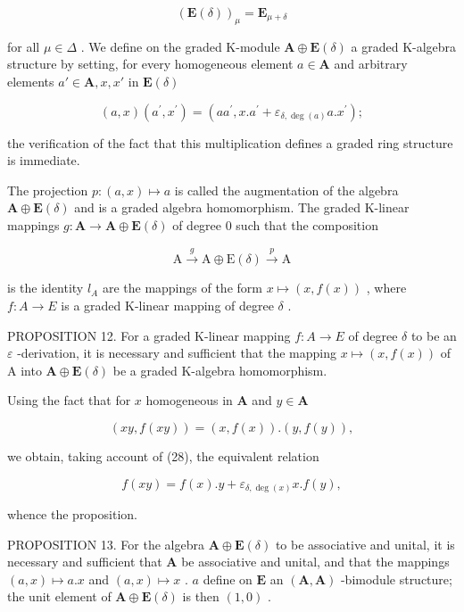 \[
(\mathbf {E} (\delta)) _ {\mu} = \mathbf {E} _ {\mu + \delta}
\]

for all \(\mu \in \Delta\) . We define on the graded K-module \(\mathbf{A} \oplus \mathbf{E}(\delta)\) a graded K-algebra structure by setting, for every homogeneous element \(a \in \mathbf{A}\) and arbitrary elements \(a' \in \mathbf{A}, x, x'\) in \(\mathbf{E}(\delta)\)

\[
(a, x) \left(a ^ {\prime}, x ^ {\prime}\right) = \left(a a ^ {\prime}, x. a ^ {\prime} + \varepsilon_ {\delta, \deg (a)} a. x ^ {\prime}\right);\tag{28}
\]

the verification of the fact that this multiplication defines a graded ring structure is immediate.

The projection \(p:(a,x)\mapsto a\) is called the augmentation of the algebra \(\mathbf{A}\oplus\mathbf{E}(\delta)\) and is a graded algebra homomorphism. The graded K-linear mappings \(g:\mathbf{A}\to\mathbf{A}\oplus\mathbf{E}(\delta)\) of degree 0 such that the composition

\[
\mathrm{A} \xrightarrow {g} \mathrm{A} \oplus \mathrm{E} (\delta) \xrightarrow {p} \mathrm{A}
\]

is the identity \(l_{A}\) are the mappings of the form \(x \mapsto (x, f(x))\) , where \(f: A \to E\) is a graded K-linear mapping of degree \(\delta\) .

PROPOSITION 12. For a graded K-linear mapping \(f:A\to E\) of degree \(\delta\) to be an \(\varepsilon\) -derivation, it is necessary and sufficient that the mapping \(x\mapsto(x,f(x))\) of A into \(\mathbf{A}\oplus\mathbf{E}(\delta)\) be a graded K-algebra homomorphism.

Using the fact that for \(x\) homogeneous in \(\mathbf{A}\) and \(y \in \mathbf{A}\)

\[
(x y, f (x y)) = (x, f (x)). (y, f (y)),
\]

we obtain, taking account of (28), the equivalent relation

\[
f (x y) = f (x). y + \varepsilon_ {\delta , \deg (x)} x. f (y),
\]

whence the proposition.

PROPOSITION 13. For the algebra \(\mathbf{A} \oplus \mathbf{E}(\delta)\) to be associative and unital, it is necessary and sufficient that \(\mathbf{A}\) be associative and unital, and that the mappings \((a, x) \mapsto a.x\) and \((a, x) \mapsto x\) . \(a\) define on \(\mathbf{E}\) an \((\mathbf{A}, \mathbf{A})\) -bimodule structure; the unit element of \(\mathbf{A} \oplus \mathbf{E}(\delta)\) is then \((1, 0)\) .

